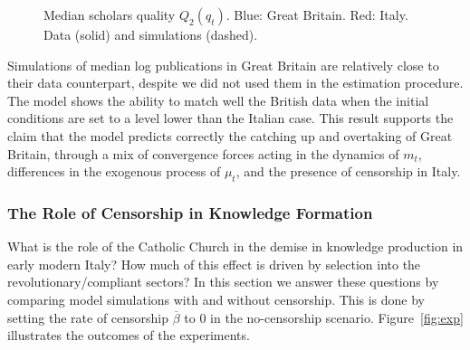 \begin{figure}[htb]	
	\centering
	\hspace*{-1cm}
	
	\scalebox{0.36}{ }
	
	\caption{Median scholars quality $Q_2(q_t)$. Blue: Great Britain. Red: Italy.  \\ Data (solid) and simulations (dashed). }
	\label{fig:Sq_uk}
\end{figure}

Simulations of median log publications in Great Britain are relatively close to their data counterpart, despite we did not used them in the estimation procedure. The model shows the ability to match well the British data when the initial conditions are set to a level lower than the Italian case. This result supports the claim that the model predicts correctly the catching up and overtaking of Great Britain, through a mix of convergence forces acting in the dynamics of $m_t$, differences in the  exogenous process of $\mu_t$, and the presence of censorship in Italy.


\subsubsection*{The Role of Censorship in Knowledge Formation}

What is the role of the Catholic Church in the demise in knowledge production in early modern Italy? How much of this effect is driven by selection into the revolutionary/compliant sectors? In this section we answer these questions by comparing model simulations with and without censorship. This is done by setting the rate of censorship $\overline{\beta}$ to $0$ in the no-censorship scenario. Figure~\ref{fig:exp} illustrates the outcomes of the experiments.

